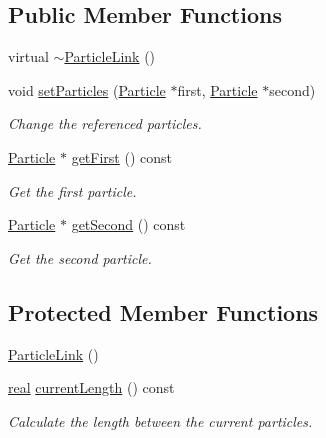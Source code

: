 \subsection*{Public Member Functions}
\begin{DoxyCompactItemize}
\item 
virtual \mbox{\hyperlink{classr3_1_1_particle_link_a4477af9dbe9041010985492df2656e55}{$\sim$\+Particle\+Link}} ()
\item 
void \mbox{\hyperlink{classr3_1_1_particle_link_a6c199dcab0ac23674e0069e54bd841c4}{set\+Particles}} (\mbox{\hyperlink{classr3_1_1_particle}{Particle}} $\ast$first, \mbox{\hyperlink{classr3_1_1_particle}{Particle}} $\ast$second)
\begin{DoxyCompactList}\small\item\em Change the referenced particles. \end{DoxyCompactList}\item 
\mbox{\hyperlink{classr3_1_1_particle}{Particle}} $\ast$ \mbox{\hyperlink{classr3_1_1_particle_link_a432355211b3aa1353a33aaf9f003825e}{get\+First}} () const
\begin{DoxyCompactList}\small\item\em Get the first particle. \end{DoxyCompactList}\item 
\mbox{\hyperlink{classr3_1_1_particle}{Particle}} $\ast$ \mbox{\hyperlink{classr3_1_1_particle_link_a90a94eda0137a354739dc00923ee7f03}{get\+Second}} () const
\begin{DoxyCompactList}\small\item\em Get the second particle. \end{DoxyCompactList}\end{DoxyCompactItemize}
\subsection*{Protected Member Functions}
\begin{DoxyCompactItemize}
\item 
\mbox{\hyperlink{classr3_1_1_particle_link_adc17e9225ff4f49803f5d5fe0a117af2}{Particle\+Link}} ()
\item 
\mbox{\hyperlink{namespacer3_ab2016b3e3f743fb735afce242f0dc1eb}{real}} \mbox{\hyperlink{classr3_1_1_particle_link_a5ad76e8eb6f9b78e3589c74e5d5013fc}{current\+Length}} () const
\begin{DoxyCompactList}\small\item\em Calculate the length between the current particles. \end{DoxyCompactList}\end{DoxyCompactItemize}
